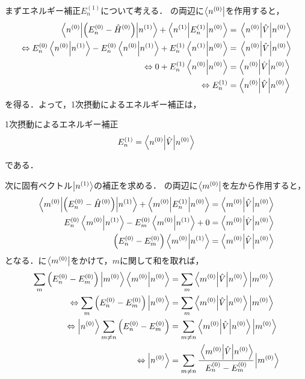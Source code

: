 \documentclass{report}
\begin{document}
  まずエネルギー補正$E_n^{(1)}$について考える．
  の両辺に$\bra{n^{(0)}}$を作用すると，
  \begin{align}
    \mel**{n^{(0)}}{\qty(E_n^{(0)} - \hat{H}^{(0)})}{n^{(1)}} + \mel**{n^{(1)}}{E_n^{(1)}}{n^{(0)}} &= \mel{n^{(0)}}{\hat{V}}{n^{(0)}} \\ 
    \Leftrightarrow E_n^{(0)}\braket{n^{(0)}}{n^{(1)}} - E_n^{(0)}\braket{n^{(0)}}{n^{(1)}} + E_n^{(1)}\braket{n^{(1)}}{n^{(0)}} &= \mel{n^{(0)}}{\hat{V}}{n^{(0)}} \\ 
    \Leftrightarrow 0 + E_n^{(1)}\braket{n^{(0)}} &= \ev**{\hat{V}}{n^{(0)}} \\ 
    \Leftrightarrow E_n^{(1)} &= \ev**{\hat{V}}{n^{(0)}}
  \end{align}
  を得る．よって，1次摂動によるエネルギー補正は，
  \begin{itembox}[l]{1次摂動によるエネルギー補正}
    \begin{align}
      E_n^{(1)} = \ev**{\hat{V}}{n^{(0)}}
    \end{align}
  \end{itembox}
  である．
  \par
  次に固有ベクトル$\ket{n^{(1)}}$の補正を求める．
  の両辺に$\bra{m^{(0)}}$を左から作用すると，
  \begin{align}
    \mel**{m^{(0)}}{\qty(E_n^{(0)} - \hat{H}^{(0)})}{n^{(1)}} + \mel**{m^{(0)}}{E_n^{(1)}}{n^{(0)}} &= \mel**{m^{(0)}}{\hat{V}}{n^{(0)}} \\ 
    E_n^{(0)}\braket{m^{(0)}}{n^{(1)}} - E_m^{(0)}\braket{m^{(0)}}{n^{(1)}} + 0 &= \mel**{m^{(0)}}{\hat{V}}{n^{(0)}}\\
    \qty(E_n^{(0)} - E_m^{(0)})\braket{m^{(0)}}{n^{(1)}} &= \mel**{m^{(0)}}{\hat{V}}{n^{(0)}} \label{1st-perturbation-prep}
  \end{align}
  となる．に$\bra{m^{(0)}}$をかけて，$m$に関して和を取れば，
  \begin{align}
    \sum_{m}\qty(E_n^{(0)} - E_m^{(0)})\ket{m^{(0)}}\braket{m^{(0)}}{n^{(0)}} &= \sum_{m}\mel**{m^{(0)}}{\hat{V}}{n^{(0)}}\ket{m^{(0)}} \\ 
    \Leftrightarrow \sum_{m}\qty(E_n^{(0)} - E_m^{(0)})\ket{n^{(0)}} &= \sum_{m}\mel**{m^{(0)}}{\hat{V}}{n^{(0)}}\ket{m^{(0)}} \\ 
    \Leftrightarrow \ket{n^{(0)}}\sum_{m \neq n}\qty(E_n^{(0)} - E_m^{(0)}) &= \sum_{m \neq n}\mel**{m^{(0)}}{\hat{V}}{n^{(0)}}\ket{m^{(0)}} \\
    \Leftrightarrow \ket{n^{(0)}} &= \sum_{m\neq n}\cfrac{\mel**{m^{(0)}}{\hat{V}}{n^{(0)}}}{E_n^{(0)} - E_m^{(0)}}\ket{m^{(0)}}
  \end{align}
\end{document}
